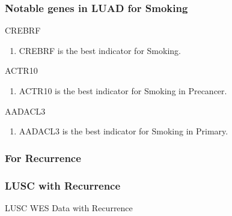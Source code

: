 \documentclass{beamer}
\begin{document}
    \begin{frame}[allowframebreaks]
        \frametitle{Notable genes in LUAD for Smoking}

        \begin{block}{CREBRF}
            \begin{enumerate}
                \item CREBRF is the best indicator for Smoking.
            \end{enumerate}
        \end{block}

        \begin{block}{ACTR10}
            \begin{enumerate}
                \item ACTR10 is the best indicator for Smoking in Precancer.
            \end{enumerate}
        \end{block}

        \begin{block}{AADACL3}
            \begin{enumerate}
                \item AADACL3 is the best indicator for Smoking in Primary.
            \end{enumerate}
        \end{block}
    \end{frame}

    \subsubsection{For Recurrence}
    \begin{frame}
        \frametitle{LUSC with Recurrence}

        \begin{table}
            \caption{LUSC WES Data with Recurrence}
            \resizebox{!}{0.3 \textheight}
            {}
        \end{table}
    \end{frame}
\end{document}
